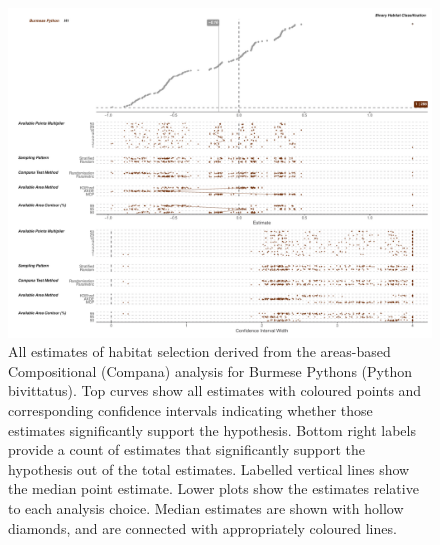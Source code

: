 \documentclass[10pt,a4paper]{article}
\begin{document}
\begin{figure}[h]
\includegraphics[width=1\linewidth]{../../figures/specCurve_Burmese Python_area} \caption{All estimates of habitat selection derived from the areas-based Compositional (Compana) analysis for Burmese Pythons (Python bivittatus). Top curves show all estimates with coloured points and corresponding confidence intervals indicating whether those estimates significantly support the hypothesis. Bottom right labels provide a count of estimates that significantly support the hypothesis out of the total estimates. Labelled vertical lines show the median point estimate. Lower plots show the estimates relative to each analysis choice. Median estimates are shown with hollow diamonds, and are connected with appropriately coloured lines.}\label{fig:specCurveAreaPYBI}
\end{figure}
\end{document}
